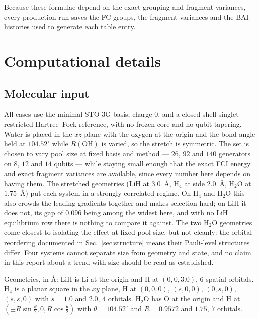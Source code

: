 \documentclass[10pt]{article}
\begin{document}
Because these formulae depend on the exact grouping and fragment variances, every production run saves the FC groups, the fragment variances and the BAI histories used to generate each table entry.

\section{Computational details}
\label{sec:computational}

\subsection{Molecular input}

All cases use the minimal STO-3G basis, charge $0$, and a closed-shell singlet restricted Hartree--Fock reference, with no frozen core and no qubit tapering. Water is placed in the $xz$ plane with the oxygen at the origin and the bond angle held at $104.52^\circ$ while $R(\mathrm{OH})$ is varied, so the stretch is symmetric. The set is chosen to vary pool size at fixed basis and method --- $26$, $92$ and $140$ generators on $8$, $12$ and $14$ qubits --- while staying small enough that the exact FCI energy and exact fragment variances are available, since every number here depends on having them. The stretched geometries (LiH at $3.0$~\si{\angstrom}, H$_4$ at side $2.0$~\si{\angstrom}, H$_2$O at $1.75$~\si{\angstrom}) put each system in a strongly correlated regime. On H$_4$ and H$_2$O this also crowds the leading gradients together and makes selection hard; on LiH it does not, its gap of $0.096$ being among the widest here, and with no LiH equilibrium row there is nothing to compare it against. The two H$_2$O geometries come closest to isolating the effect at fixed pool size, but not cleanly: the orbital reordering documented in Sec.~\ref{sec:structure} means their Pauli-level structures differ. Four systems cannot separate size from geometry and state, and no claim in this report about a trend with size should be read as established.

Geometries, in \si{\angstrom}: LiH is Li at the origin and H at $(0,0,3.0)$,
$6$ spatial orbitals. H$_4$ is a planar square in the $xy$ plane, H at $(0,0,0)$,
$(s,0,0)$, $(0,s,0)$, $(s,s,0)$ with $s=1.0$ and $2.0$, $4$ orbitals. H$_2$O has
O at the origin and H at $(\pm R\sin\tfrac{\theta}{2},0,R\cos\tfrac{\theta}{2})$
with $\theta=104.52^\circ$ and $R=0.9572$ and $1.75$, $7$ orbitals.
\end{document}

